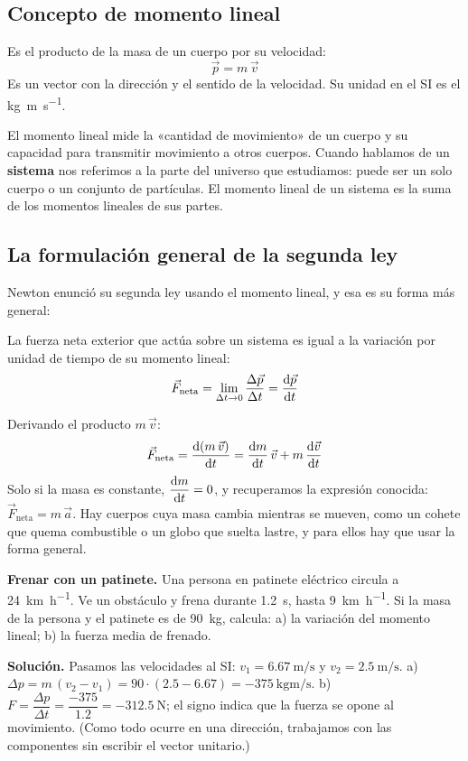 \subsection{Concepto de momento lineal}

\begin{definition}
    Es el producto de la masa de un cuerpo por su velocidad:
    \[ \vec{p} = m\,\vec{v} \]
    Es un vector con la dirección y el sentido de la velocidad. Su unidad en el SI es el \unit{\kg\m\per\s}.
\end{definition}

El momento lineal mide la «cantidad de movimiento» de un cuerpo y su capacidad para transmitir movimiento a otros cuerpos. Cuando
hablamos de un \textbf{sistema} nos referimos a la parte del universo que estudiamos: puede ser un solo cuerpo o un conjunto de
partículas. El momento lineal de un sistema es la suma de los momentos lineales de sus partes.

\subsection{La formulación general de la segunda ley}

Newton enunció su segunda ley usando el momento lineal, y esa es su forma más general:

\begin{definition}
    La fuerza neta exterior que actúa sobre un sistema es igual a la variación por unidad de tiempo de su momento lineal:
    \[ \vec{F}_{\text{neta}} = \lim_{\Delta t \to 0} \frac{\Delta\vec{p}}{\Delta t} = \frac{\mathrm{d}\vec{p}}{\mathrm{d} t} \]
\end{definition}

Derivando el producto \(m\,\vec{v}\):
\[ \vec{F}_{\text{neta}} = \frac{\mathrm{d}(m\,\vec{v})}{\mathrm{d} t} = \frac{\mathrm{d} m}{\mathrm{d} t}\,\vec{v} + m\,\frac{\mathrm{d}\vec{v}}{\mathrm{d} t} \]
Solo si la masa es constante, \(\dfrac{\mathrm{d} m}{\mathrm{d} t} = 0\), y recuperamos la expresión conocida: \(\vec{F}_{\text{neta}} = m\,\vec{a}\).
Hay cuerpos cuya masa cambia mientras se mueven, como un cohete que quema combustible o un globo que suelta lastre, y para ellos hay
que usar la forma general.

\begin{example}
    \textbf{Frenar con un patinete.} Una persona en patinete eléctrico circula a \qty{24}{\km\per\hour}. Ve un obstáculo y frena
    durante \qty{1.2}{\s}, hasta \qty{9}{\km\per\hour}. Si la masa de la persona y el patinete es de \qty{90}{\kg}, calcula: a) la
    variación del momento lineal; b) la fuerza media de frenado.

    \textbf{Solución.} Pasamos las velocidades al SI: \(v_1 = \qty{6.67}{\m\per\s}\) y \(v_2 = \qty{2.5}{\m\per\s}\).
    a) \(\Delta p = m\,(v_2 - v_1) = 90 \cdot (\num{2.5} - \num{6.67}) = \qty{-375}{\kg\m\per\s}\).
    b) \(F = \dfrac{\Delta p}{\Delta t} = \dfrac{-375}{\num{1.2}} = \qty{-312.5}{\newton}\); el signo indica que la fuerza se opone al
    movimiento. (Como todo ocurre en una dirección, trabajamos con las componentes sin escribir el vector unitario.)
\end{example}

